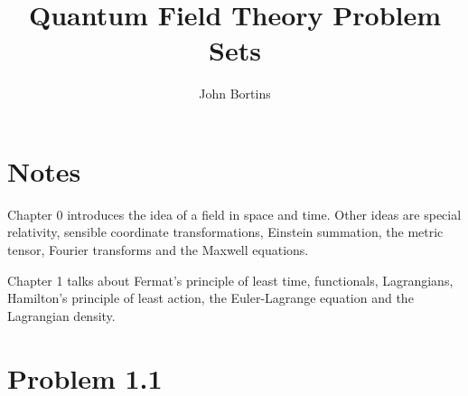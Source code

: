 \documentclass{memoir}
\title{Quantum Field Theory Problem Sets}
\author{John Bortins}
\begin{document}
\maketitle{}

\section*{Notes}

Chapter 0 introduces the idea of a field in space and time. Other ideas are special relativity, sensible coordinate transformations, Einstein summation, the metric tensor, Fourier transforms and the Maxwell equations.

Chapter 1 talks about Fermat's principle of least time, functionals, Lagrangians, Hamilton's principle of least action, the Euler-Lagrange equation and the Lagrangian density.

\section*{Problem 1.1}
\end{document}
